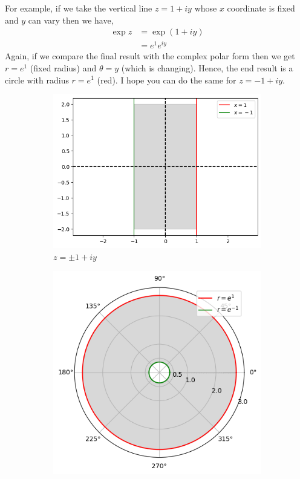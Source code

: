For example, if we take the vertical line $z=1+iy$ whose $x$ coordinate is fixed and $y$ can vary then we have, 
\begin{align*}
    \exp{z}&=\exp\left(1+iy\right)\\
    &= e^{1}e^{iy}
\end{align*}
Again, if we compare the final result with the complex polar form then we get $r=e^1$ (fixed radius) and $\theta=y$ (which is changing). Hence, the end result is a circle with radius $r=e^1$ (red). I hope you can do the same for $z=-1+iy$. 
\begin{figure}[htbp]
    \centering
    \begin{subfigure}[b]{0.45\textwidth}
        \centering
        \includegraphics[width=\linewidth]{FIG_MAT215/exp z vertical strip.png}
        \caption{$z = \pm 1+iy$}
        \label{fig:exp_inputs_h}
    \end{subfigure}
    \hfill
    \begin{subfigure}[b]{0.45\textwidth}
        \centering
        \includegraphics[width=\linewidth]{FIG_MAT215/exp z vertical strip out.png}

\end{subfigure}
\end{figure}
